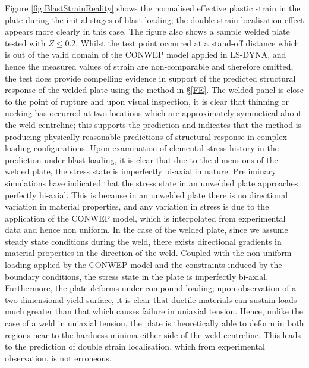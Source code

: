 Figure \ref{fig:BlastStrainReality} shows the normalised effective plastic strain in the plate during the initial stages of blast loading; the double strain localisation effect appears more clearly in this case. The figure also shows a sample welded plate tested with $Z\leq0.2$. Whilst the test point occurred at a stand-off distance which is out of the valid domain of the CONWEP model applied in LS-DYNA, and hence the measured values of strain are non-comparable and therefore omitted, the test does provide compelling evidence in support of the predicted structural response of the welded plate using the method in \S\ref{FE}. The welded panel is close to the point of rupture and upon visual inspection, it is clear that thinning or necking has occurred at two locations which are approximately symmetical about the weld centreline; this supports the prediction and indicates that the method is producing physically reasonable predictions of structural response in complex loading configurations. Upon examination of elemental stress history in the prediction under blast loading, it is clear that due to the dimensions of the welded plate, the stress state is imperfectly bi-axial in nature. Preliminary simulations have indicated that the stress state in an unwelded plate approaches perfectly bi-axial. This is because in an unwelded plate there is no directional variation in material properties, and any variation in stress is due to the application of the CONWEP model, which is interpolated from experimental data and hence non uniform. In the case of the welded plate, since we assume steady state conditions during the weld, there exists directional gradients in material properties in the direction of the weld. Coupled with the non-uniform loading applied by the CONWEP model and the constraints induced by the boundary conditions, the stress state in the plate is imperfectly bi-axial. Furthermore, the plate deforms under compound loading; upon observation of a two-dimensional yield surface, it is clear that ductile materials can sustain loads much greater than that which causes failure in uniaxial tension. Hence, unlike the case of a weld in uniaxial tension, the plate is theoretically able to deform in both regions near to the hardness minima either side of the weld centreline. This leads to the prediction of double strain localisation, which from experimental observation, is not erroneous. 

